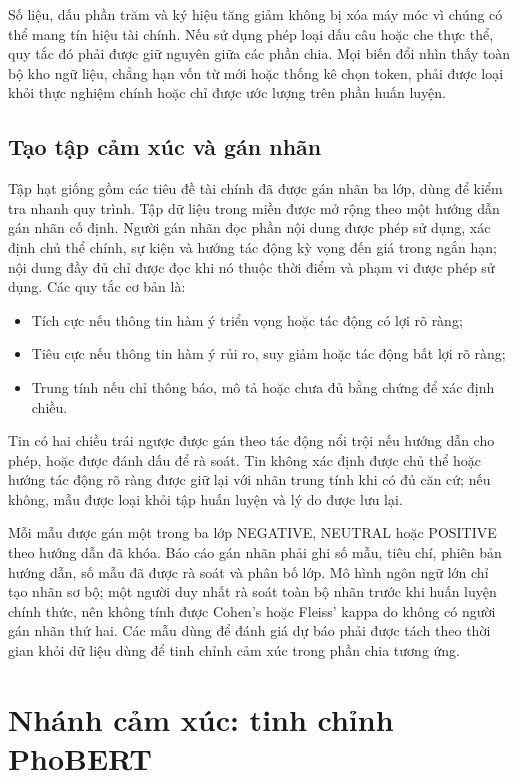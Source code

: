 Số liệu, dấu phần trăm và ký hiệu tăng giảm không bị xóa máy móc vì chúng có thể mang
tín hiệu tài chính. Nếu sử dụng phép loại dấu câu hoặc che thực thể, quy tắc đó phải
được giữ nguyên giữa các phần chia. Mọi biến đổi nhìn thấy toàn bộ kho ngữ liệu, chẳng
hạn vốn từ mới hoặc thống kê chọn token, phải được loại khỏi thực nghiệm chính hoặc
chỉ được ước lượng trên phần huấn luyện.

\subsection{Tạo tập cảm xúc và gán nhãn}

Tập hạt giống gồm các tiêu đề tài chính đã được gán nhãn ba lớp, dùng để kiểm tra
nhanh quy trình. Tập dữ liệu trong miền được mở rộng theo một hướng dẫn gán nhãn cố
định. Người gán nhãn đọc phần nội dung được phép sử dụng, xác định chủ thể chính, sự
kiện và hướng tác động kỳ vọng đến giá trong ngắn hạn; nội dung đầy đủ chỉ được đọc
khi nó thuộc thời điểm và phạm vi được phép sử dụng. Các quy tắc cơ bản là:

\begin{itemize}[nosep]
  \item Tích cực nếu thông tin hàm ý triển vọng hoặc tác động có lợi rõ ràng;
  \item Tiêu cực nếu thông tin hàm ý rủi ro, suy giảm hoặc tác động bất lợi rõ ràng;
  \item Trung tính nếu chỉ thông báo, mô tả hoặc chưa đủ bằng chứng để xác định chiều.
\end{itemize}

Tin có hai chiều trái ngược được gán theo tác động nổi trội nếu hướng dẫn cho phép,
hoặc được đánh dấu để rà soát. Tin không xác định được chủ thể hoặc hướng tác động rõ
ràng được giữ lại với nhãn trung tính khi có đủ căn cứ; nếu không, mẫu được loại khỏi
tập huấn luyện và lý do được lưu lại.

Mỗi mẫu được gán một trong ba lớp NEGATIVE, NEUTRAL hoặc POSITIVE theo hướng dẫn đã
khóa. Báo cáo gán nhãn phải ghi số mẫu, tiêu chí, phiên bản hướng dẫn, số mẫu đã được
rà soát và phân bố lớp. Mô hình ngôn ngữ lớn chỉ tạo nhãn sơ bộ; một người duy nhất
rà soát toàn bộ nhãn trước khi huấn luyện chính thức, nên không tính được Cohen's hoặc
Fleiss' kappa do không có người gán nhãn thứ hai. Các mẫu dùng để đánh giá dự báo phải
được tách theo thời gian khỏi dữ liệu dùng để tinh chỉnh cảm xúc trong phần chia
tương ứng.

\section{Nhánh cảm xúc: tinh chỉnh PhoBERT}
\label{sec:pp-phobert}

